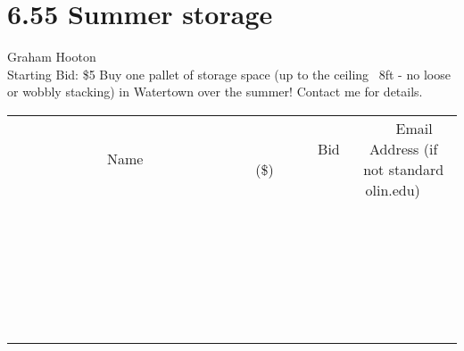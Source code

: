 \documentclass[11pt]{article}
\begin{document}
\section*{6.55 Summer storage}
Graham Hooton
\\
Starting Bid: \$5
\newline
Buy one pallet of storage space (up to the ceiling ~8ft - no loose or wobbly stacking) in Watertown over the summer! Contact me for details.
\\[6ex]
\begin{tabular}{c c c}
~~~~~~~~~~~~~Name~~~~~~~~~~~~~ & ~~~~~~~~~Bid (\$)~~~~~~~~~  & ~~~Email Address (if not standard olin.edu)~~~\\
 & & \\
\hline
 & & \\
\hline
 & & \\
\hline
 & & \\
\hline
 & & \\
\hline
 & & \\
\hline
 & & \\
\hline
 & & \\
\hline
 & & \\
\hline
 & & \\
\hline
 & & \\
\hline
 & & \\
\hline
 & & \\
\hline
 & & \\
\hline
 & & \\
\hline
 & & \\
\hline
 & & \\
\hline
 & & \\
\hline
 & & \\
\hline
 & & \\
\hline
 & & \\
\hline
 & & \\
\hline
 & & \\
\hline
 & & \\
\hline
 & & \\
\hline
 & & \\
\hline
\end{tabular}
\newpage
\end{document}
